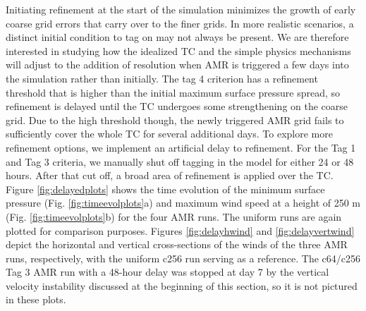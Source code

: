 Initiating refinement at
the start of the simulation minimizes the growth of 
early coarse grid errors that carry over to the finer grids. 
In more realistic scenarios, a
distinct initial condition to tag on may not always be present. 
We are therefore interested in studying how the idealized TC and the simple physics mechanisms will
adjust to the addition of resolution when AMR is triggered a few 
days into the simulation rather than initially. 
The tag 4 criterion has a refinement threshold that is higher than the initial 
maximum surface pressure spread, so refinement is delayed
until the TC undergoes some strengthening on the coarse grid. Due 
to the high threshold though, the newly triggered AMR grid fails to sufficiently 
cover the whole TC for several additional days. To explore more refinement 
options, we implement an artificial delay to refinement. For the Tag 1 
and Tag 3 criteria, we manually shut off tagging in the model for either 24 
or 48 hours.  After that cut off, a broad area of refinement is applied over the TC.
Figure \ref{fig:delayedplots} shows the time evolution of the minimum surface
pressure (Fig. \ref{fig:timeevolplots}a) and maximum wind speed at a height 
of 250 m (Fig. \ref{fig:timeevolplots}b) for the four AMR runs.  The uniform 
runs are again plotted for comparison purposes. Figures \ref{fig:delayhwind} 
and \ref{fig:delayvertwind} depict the horizontal and vertical cross-sections of
the winds of the three AMR runs, respectively, with the uniform c256 run 
serving as a reference. 
The c64/c256 Tag 3 AMR run with a 48-hour delay was stopped at day 7 by 
the vertical velocity instability discussed at the beginning of this section, so
it is not pictured in these plots.

